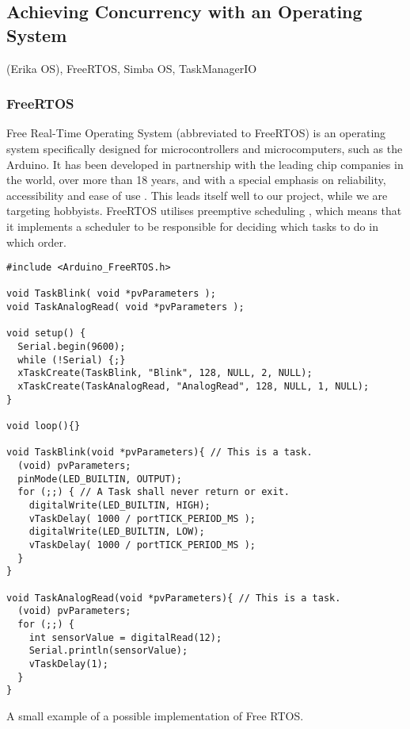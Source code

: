 \subsection{Achieving Concurrency with an Operating System}
(Erika OS), FreeRTOS, Simba OS, TaskManagerIO






\subsubsection{FreeRTOS}

Free Real-Time Operating System (abbreviated to FreeRTOS) is an operating system specifically designed for microcontrollers and microcomputers, such as the Arduino. It has been developed in partnership with the leading chip companies in the world, over more than 18 years, and with a special emphasis on reliability, accessibility and ease of use \cite{AboutRTOS}. This leads itself well to our project, while we are targeting hobbyists. FreeRTOS utilises preemptive scheduling \cite{SchedulingRTOS}, which means that it implements a scheduler to be responsible for deciding which tasks to do in which order.



\begin{listing}[htb!]
  \centering
  \begin{verbatim}
#include <Arduino_FreeRTOS.h>

void TaskBlink( void *pvParameters );
void TaskAnalogRead( void *pvParameters );

void setup() {
  Serial.begin(9600);
  while (!Serial) {;}
  xTaskCreate(TaskBlink, "Blink", 128, NULL, 2, NULL);
  xTaskCreate(TaskAnalogRead, "AnalogRead", 128, NULL, 1, NULL);
}

void loop(){}

void TaskBlink(void *pvParameters){ // This is a task.
  (void) pvParameters;
  pinMode(LED_BUILTIN, OUTPUT);
  for (;;) { // A Task shall never return or exit.
    digitalWrite(LED_BUILTIN, HIGH);
    vTaskDelay( 1000 / portTICK_PERIOD_MS );
    digitalWrite(LED_BUILTIN, LOW);
    vTaskDelay( 1000 / portTICK_PERIOD_MS );
  }
}

void TaskAnalogRead(void *pvParameters){ // This is a task.
  (void) pvParameters;
  for (;;) {
    int sensorValue = digitalRead(12);
    Serial.println(sensorValue);
    vTaskDelay(1);
  }
}
\end{verbatim}
  \caption{A small example of a possible implementation of Free RTOS.}
  \label{List:freeftosexample}
\end{listing}

